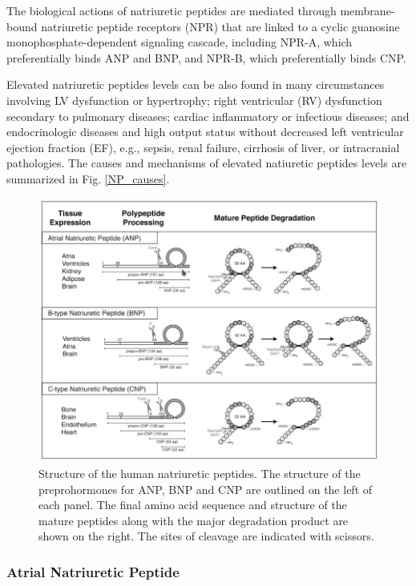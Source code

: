 \documentclass[14pt,a4paper,onecolumn]{extarticle}
\begin{document}
 The biological actions of natriuretic peptides are mediated through membrane-bound natriuretic peptide receptors (NPR) that are linked to a cyclic guanosine monophosphate-dependent signaling cascade, including NPR-A, which preferentially binds ANP and BNP, and NPR-B, which preferentially binds CNP.

Elevated natriuretic peptides levels can be also found in many circumstances involving LV dysfunction or hypertrophy; right ventricular (RV) dysfunction secondary to pulmonary diseases; cardiac inflammatory or infectious diseases; and endocrinologic diseases and high output status without decreased left ventricular ejection fraction (EF), e.g., sepsis, renal failure, cirrhosis of liver, or intracranial pathologies. The causes and mechanisms of elevated natiuretic peptides levels are summarized in Fig. \ref{NP_causes}. %

\begin{figure}
    \centering
    \includegraphics[scale=0.4]{../../images/NP_structure.png}
    \caption{Structure of the human natriuretic peptides. The structure of the preprohormones for ANP, BNP and CNP are outlined on the left of each panel. The final amino acid sequence and structure of the mature peptides along with the major degradation product are shown on the right. The sites of cleavage are indicated with scissors.}
    \label{NP_structure}
\end{figure}

\subsubsection{Atrial Natriuretic Peptide}
\end{document}
